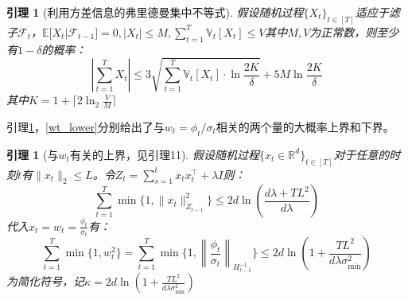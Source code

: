 \documentclass[UTF8,a4paper,10.5pt]{ctexart}
\newcommand{\Fcal}{\mathcal F}
\newcommand{\E}{\mathbb{E}}
\newcommand{\V}{\mathbb{V}}
\newcommand{\R}{\mathbb{R}}
\newtheorem{lemma}[theorem]{引理}
\begin{document}
\begin{lemma}[利用方差信息的弗里德曼集中不等式]\cite{VFreedman}
	假设随机过程$\{X_t\}_{t\in [T]}$适应于滤子$\Fcal_t$，$\E[X_t|\Fcal_{t-1}]=0, |X_t|\leq M,\sum_{t=1}^T\V_t[X_t]\leq V$其中$M, V$为正常数，则至少有$1-\delta$的概率：
	\begin{equation*}
		|\sum_{t=1}^T X_t| \leq 3\sqrt{\sum_{t=1}^{T}\V_t[X_t]\cdot \ln\frac{2K}{\delta}}+5M\ln\frac{2K}{\delta}
	\end{equation*}
	其中$K = 1+\lceil 2\ln_2\frac{V}{M}\rceil $
	\label{Freedman+}
\end{lemma}
引理\ref{wt_up}，\ref{wt_lower}分别给出了与$w_t = \phi_t/\sigma_t$相关的两个量的大概率上界和下界。
\begin{lemma}[与$w_t$有关的上界，见\cite{nips11}引理11]
	假设随机过程$\{x_t\in \R^d\}_{t\in [T]}$对于任意的时刻$t$有$\|x_t\|_2\leq L$。令$Z_t = \sum_{s=1}^{t}x_tx_t^\top+\lambda I$则：
	\begin{equation*}
		\sum_{t=1}^{T} \min \{1,\|x_t\|_{Z_{t-1}}^2 \} \leq 2d \ln \left( \frac{d\lambda+TL^2}{d\lambda} \right)
	\end{equation*}
	代入$x_t = w_t = \frac{\phi_t}{\sigma_t}$有：
	\begin{equation}
		\sum_{t=1}^T\min\{1,w_t^2\} = \sum_{t=1}^T \min\{1,\left\|\frac{\phi_t}{\sigma_t}\right\|_{H_{t-1}^{-1}}\} \leq 2d\ln\left(1+\frac{TL^2}{d\lambda \sigma_{\min}^2}\right)
	\end{equation}
	为简化符号，记$\kappa = 2d\ln\left(1+\frac{TL^2}{d\lambda \sigma_{\min}^2}\right)$
	\label{wt_up}
\end{lemma}
\end{document}
